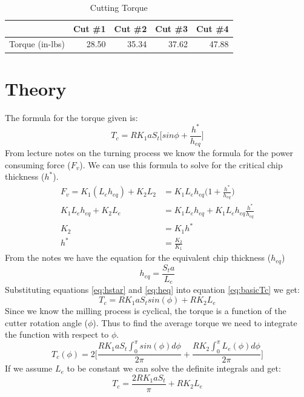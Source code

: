 \documentclass[12pt]{article}
\begin{document}
\begin{table}[htbp]
  \centering
  \caption{Cutting Torque}
    \begin{tabular}{|l|rrrr|}
    \hline
          & \multicolumn{1}{l}{Cut \#1} & \multicolumn{1}{l}{Cut \#2} & \multicolumn{1}{l}{Cut \#3 } & \multicolumn{1}{l|}{Cut \#4} \\
    \hline
    Torque (in-lbs) & 28.50 & 35.34 & 37.62 & 47.88 \\
    \hline
    \end{tabular}%
  \label{tab:torques}%
\end{table}%
\section{Theory}
The formula for the torque given is:
\begin{equation}
\label{eq:basicTc}
    T_c=RK_1aS_t\Big[sin\phi + \frac{h^*}{h_{eq}}\Big]
\end{equation}
From lecture notes on the turning process we know the formula for the power consuming force ($F_v$). We can use this formula to solve for the critical chip thickness ($h^*$).
\begin{align}
    F_v=K_1(L_eh_{eq}) + K_2L_2 &= K_1L_eh_{eq}\Big(1+\frac{h^*}{h_{eq}}\Big)\\
    K_1L_eh_{eq}+K_2L_e&=K_1L_eh_{eq}+K_1L_eh_{eq}\frac{h^*}{h_{eq}}\nonumber\\
    K_2&=K_1h^*\nonumber\\
    h^*&=\frac{K_2}{K_1}\label{eq:hstar}
\end{align}
From the notes we have the equation for the equivalent chip thickness ($h_{eq}$)
\begin{equation}
\label{eq:heq}
    h_{eq}=\frac{S_ta}{L_e}
\end{equation}
Substituting equations \ref{eq:hstar} and \ref{eq:heq} into equation \ref{eq:basicTc} we get:
\begin{equation}
    T_c=RK_1aS_tsin(\phi) + RK_2L_e
\end{equation}
Since we know the milling process is cyclical, the torque is a function of the cutter rotation angle ($\phi$). Thus to find the average torque we need to integrate the function with respect to $\phi$.
\begin{equation}
    \label{eq:Tc_given}
    T_c(\phi)=2\Big[\frac{RK_1aS_t\int_{0}^{\pi}sin(\phi) d\phi}{2\pi}+\frac{RK_2\int_{0}^{\pi}L_e(\phi) d\phi}{2\pi}\Big]
\end{equation}
If we assume $L_e$ to be constant we can solve the definite integrals and get:
\begin{equation}
    T_c=\frac{2RK_1aS_t}{\pi} + RK_2L_e
    \end{equation}
\end{document}

